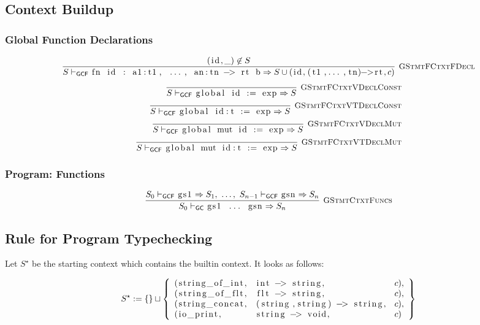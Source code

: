 \documentclass{article}
\newcommand{\code}[1]{\lstinline[columns=fixed]{#1}}
\newcommand{\drmrule}[5]{\frac{#1}{#2\vdash_{\mathsf{#3}}#4}\textsc{\ \small{#5}}}
\newcommand{\ruleapp}[1]{\vdash_{\mathsf{#1}}}
\newcommand{\mc}[1]{\textnormal{\code{#1}}}
\begin{document}
		\subsection{Context Buildup}
		
			\subsubsection{Global Function Declarations}
			
				\begin{align*}
					\drmrule{(\mc{id},\_) \not\in S}{S}{GCF}{\mc{fn id : a1:t1, ..., an:tn -> rt b} \Rightarrow S \cup (\mc{id}, \mc{(t1,...,tn)->rt}, c)}{GStmtFCtxtFDecl}
				\end{align*}
				\begin{align*}
					\drmrule{}{S}{GCF}{\mc{global id := exp} \Rightarrow S}{GStmtFCtxtVDeclConst}\\
					\drmrule{}{S}{GCF}{\mc{global id:t := exp} \Rightarrow S}{GStmtFCtxtVTDeclConst}\\
					\drmrule{}{S}{GCF}{\mc{global mut id := exp} \Rightarrow S}{GStmtFCtxtVDeclMut}\\
					\drmrule{}{S}{GCF}{\mc{global mut id:t := exp} \Rightarrow S}{GStmtFCtxtVTDeclMut}
				\end{align*}
			
			\subsubsection{Program: Functions}
			
				\begin{align*}
					\drmrule{S_0 \ruleapp{GCF} \mc{gs1} \Rightarrow S_1,\ \dots,\ S_{n-1} \ruleapp{GCF} \mc{gsn} \Rightarrow S_n}{S_0}{GC}{\mc{gs1 ... gsn} \Rightarrow S_n}{GStmtCtxtFuncs}
				\end{align*}
			
		\subsection{Rule for Program Typechecking}
		
			Let $S^\star$ be the starting context which contains the builtin context. It looks as follows:
			
			\begin{align*}
				S^\star := \{\}\sqcup \left\{
					\begin{array}{lll}
						(\mc{string\_of\_int},&\mc{int -> string},&c),\\ (\mc{string\_of\_flt},&\mc{flt -> string},&c),\\
						(\mc{string\_concat},&\mc{(string,string) -> string},&c),\\
						(\mc{io\_print},&\mc{string -> void},&c)
					\end{array}
				\right\}
			\end{align*}
		
\end{document}
